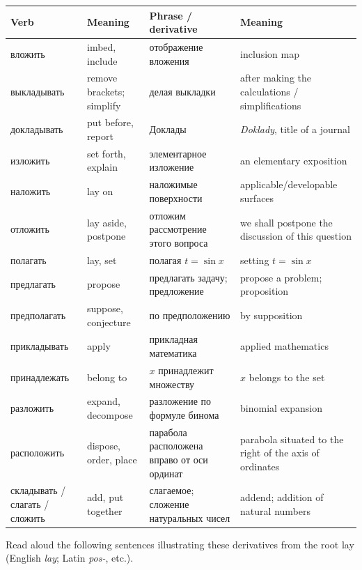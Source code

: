 \begingroup
\small
\setlength{\tabcolsep}{3pt}
\renewcommand{\arraystretch}{1.06}
\begin{longtable}{@{}>{\cyrillicfont}p{34mm}p{28mm}>{\cyrillicfont}p{48mm}p{35mm}@{}}
\toprule
\normalfont Verb & Meaning & \normalfont Phrase / derivative & Meaning\\
\midrule
\endhead
вложить & imbed, include & отображение вложения & inclusion map\\
выкладывать & remove brackets; simplify & делая выкладки & after making the calculations / simplifications\\
докладывать & put before, report & Доклады & \emph{Doklady}, title of a journal\\
изложить & set forth, explain & элементарное изложение & an elementary exposition\\
наложить & lay on & наложимые поверхности & applicable/developable surfaces\\
отложить & lay aside, postpone & отложим рассмотрение этого вопроса & we shall postpone the discussion of this question\\
полагать & lay, set & полагая $t=\sin x$ & setting $t=\sin x$\\
предлагать & propose & предлагать задачу; предложение & propose a problem; proposition\\
предполагать & suppose, conjecture & по предположению & by supposition\\
прикладывать & apply & прикладная математика & applied mathematics\\
принадлежать & belong to & $x$ принадлежит множеству & $x$ belongs to the set\\
разложить & expand, decompose & разложение по формуле бинома & binomial expansion\\
расположить & dispose, order, place & парабола расположена вправо от оси ординат & parabola situated to the right of the axis of ordinates\\
складывать / слагать / сложить & add, put together & слагаемое; сложение натуральных чисел & addend; addition of natural numbers\\
\bottomrule
\end{longtable}
\endgroup

\begin{keybox}[Exercise 5.5]
Read aloud the following sentences illustrating these derivatives from the root  lay (English \emph{lay}; Latin \emph{pos-}, etc.).
\end{keybox}

